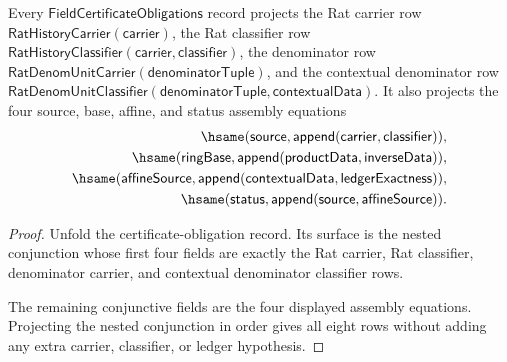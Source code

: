 \begin{theorem}
\label{thm:field-certificate-obligations-rat-denominator-rows}
Every $\mathsf{FieldCertificateObligations}$ record projects the Rat carrier
row $\mathsf{RatHistoryCarrier}(\mathsf{carrier})$, the Rat classifier row
$\mathsf{RatHistoryClassifier}(\mathsf{carrier},\mathsf{classifier})$, the
denominator row $\mathsf{RatDenomUnitCarrier}(\mathsf{denominatorTuple})$, and
the contextual denominator row
$\mathsf{RatDenomUnitClassifier}(\mathsf{denominatorTuple},\mathsf{contextualData})$.
It also projects the four source, base, affine, and status assembly equations
$$
\begin{aligned}
\hsame(\mathsf{source},\mathsf{append}(\mathsf{carrier},\mathsf{classifier})),\\
\hsame(\mathsf{ringBase},\mathsf{append}(\mathsf{productData},\mathsf{inverseData})),\\
\hsame(\mathsf{affineSource},\mathsf{append}(\mathsf{contextualData},\mathsf{ledgerExactness})),\\
\hsame(\mathsf{status},\mathsf{append}(\mathsf{source},\mathsf{affineSource})).
\end{aligned}
$$
\end{theorem}
\begin{proof}
Unfold the certificate-obligation record. Its surface is the nested conjunction
whose first four fields are exactly the Rat carrier, Rat classifier,
denominator carrier, and contextual denominator classifier rows.

The remaining conjunctive fields are the four displayed assembly equations.
Projecting the nested conjunction in order gives all eight rows without adding
any extra carrier, classifier, or ledger hypothesis.
\end{proof}

